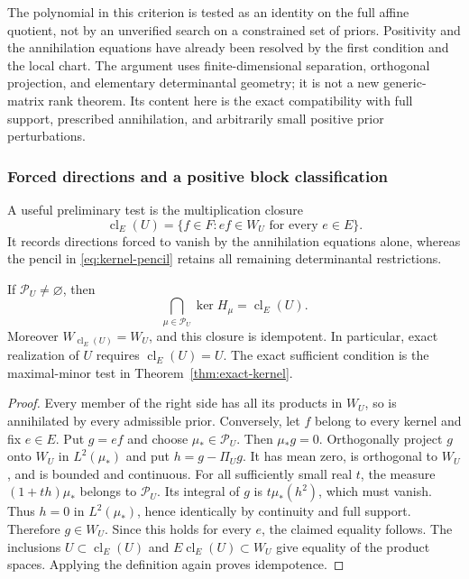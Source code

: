 The polynomial in this criterion is tested as an identity on the full
affine quotient, not by an unverified search on a constrained set of
priors. Positivity and the annihilation equations have already been
resolved by the first condition and the local chart. The argument uses
finite-dimensional separation, orthogonal projection, and elementary
determinantal geometry; it is not a new generic-matrix rank theorem.
Its content here is the exact compatibility with full support, prescribed
annihilation, and arbitrarily small positive prior perturbations.

\subsubsection{Forced directions and a positive block classification}
A useful preliminary test is the multiplication closure
\begin{equation}\label{eq:kernel-closure}
 \operatorname{cl}_E(U)=\{f\in F: ef\in W_U\text{ for every }e\in E\}.
\end{equation}
It records directions forced to vanish by the annihilation equations
alone, whereas the pencil in \eqref{eq:kernel-pencil} retains all
remaining determinantal restrictions.

\begin{proposition}
\label{prop:forced-kernel}
If $\mathcal P_U\ne\varnothing$, then
\begin{equation}\label{eq:forced-kernel-intersection}
 \bigcap_{\mu\in\mathcal P_U}\ker H_\mu=\operatorname{cl}_E(U).
\end{equation}
Moreover $W_{\operatorname{cl}_E(U)}=W_U$, and this closure is
idempotent. In particular, exact realization of $U$ requires
$\operatorname{cl}_E(U)=U$. The exact sufficient condition is the
maximal-minor test in Theorem~\ref{thm:exact-kernel}.
\end{proposition}
\begin{proof}
Every member of the right side has all its products in $W_U$, so is
annihilated by every admissible prior. Conversely, let $f$ belong to
every kernel and fix $e\in E$. Put $g=ef$ and choose
$\mu_*\in\mathcal P_U$. Then $\mu_*g=0$. Orthogonally project $g$
onto $W_U$ in $L^2(\mu_*)$ and put $h=g-\Pi_U g$. It has mean
zero, is orthogonal to $W_U$, and is bounded and continuous. For all
sufficiently small real $t$, the measure $(1+th)\mu_*$ belongs to
$\mathcal P_U$. Its integral of $g$ is $t\mu_*(h^2)$, which must
vanish. Thus $h=0$ in $L^2(\mu_*)$, hence identically by continuity
and full support. Therefore $g\in W_U$. Since this holds for every
$e$, the claimed equality follows. The inclusions
$U\subset\operatorname{cl}_E(U)$ and
$E\operatorname{cl}_E(U)\subset W_U$ give equality of the product
spaces. Applying the definition again proves idempotence.
\end{proof}

